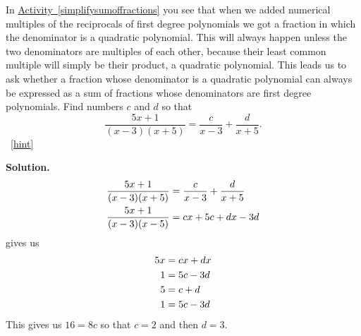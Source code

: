 \documentclass{book}
\begin{document}
\setcounter{project}{264}
\addtocounter{project}{-1}
\begin{activity}[]\label{partialfractionsintro}
\hypertarget{p-1408}{}%
In \hyperref[simplifysumoffractions]{Activity~\ref{simplifysumoffractions}} you see that when we added numerical multiples of the reciprocals of first degree polynomials we got a fraction in which the denominator is a quadratic polynomial. This will always happen unless the two denominators are multiples of each other, because their least common multiple will simply be their product, a quadratic polynomial. This leads us to ask whether a fraction whose denominator is a quadratic polynomial can always be expressed as a sum of fractions whose denominators are first degree polynomials. Find numbers \(c\) and \(d\) so that%
\begin{equation*}
\frac{5x+1}{(x-3)(x+5)} = \frac{c}{x-3} + \frac{d}{x+5}.
\end{equation*}
%
~\hfill{\tiny\hyperlink{a-264}{[hint]}\hypertarget{q-264}{}}\par\smallskip%
\noindent\textbf{Solution.}\hypertarget{solution-192}{}\quad%
\hypertarget{p-1410}{}%
%
\begin{align*}
\frac{5x+1}{(x-3)(x+5)}  &=  \frac{c}{x-3} + \frac{d}{x+5}\\
\frac{5x+1}{(x-3)(x-5)}  &= cx+5c+dx-3d
\end{align*}
gives us%
\begin{align*}
5x &= cx+dx\\
1 &= 5c-3d\\
5 &= c+d\\
1 &= 5c-3d
\end{align*}
This gives us \(16=8c\) so that \(c=2\) and then \(d=3\).%
\end{activity}
\end{document}
